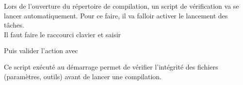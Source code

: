 Lors de l'ouverture du répertoire de compilation, un script de vérification va se lancer automatiquement.
Pour ce faire, il va falloir activer le lancement des tâches.\\ 
Il faut faire le raccourci clavier  et saisir  

Puis valider l'action avec 


Ce script exécuté au démarrage permet de vérifier l'intégrité des fichiers (paramètres, outils) avant de lancer une compilation.